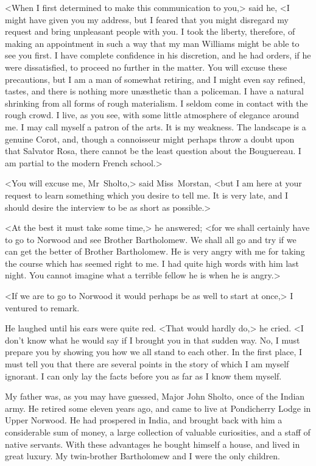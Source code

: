 <When I first determined to make this communication to you,> said he, <I might have given you my address, but I feared that you might disregard my request and bring unpleasant people with you. I took the liberty, therefore, of making an appointment in such a way that my man Williams might be able to see you first. I have complete confidence in his discretion, and he had orders, if he were dissatisfied, to proceed no further in the matter. You will excuse these precautions, but I am a man of somewhat retiring, and I might even say refined, tastes, and there is nothing more unæsthetic than a policeman. I have a natural shrinking from all forms of rough materialism. I seldom come in contact with the rough crowd. I live, as you see, with some little atmosphere of elegance around me. I may call myself a patron of the arts. It is my weakness. The landscape is a genuine Corot, and, though a connoisseur might perhaps throw a doubt upon that Salvator Rosa, there cannot be the least question about the Bouguereau. I am partial to the modern French school.>

<You will excuse me, Mr~Sholto,> said Miss~Morstan, <but I am here at your request to learn something which you desire to tell me. It is very late, and I should desire the interview to be as short as possible.>

<At the best it must take some time,> he answered; <for we shall certainly have to go to Norwood and see Brother Bartholomew. We shall all go and try if we can get the better of Brother Bartholomew. He is very angry with me for taking the course which has seemed right to me. I had quite high words with him last night. You cannot imagine what a terrible fellow he is when he is angry.>

<If we are to go to Norwood it would perhaps be as well to start at once,> I ventured to remark.

He laughed until his ears were quite red. <That would hardly do,> he cried. <I don't know what he would say if I brought you in that sudden way. No, I must prepare you by showing you how we all stand to each other. In the first place, I must tell you that there are several points in the story of which I am myself ignorant. I can only lay the facts before you as far as I know them myself.

My father was, as you may have guessed, Major John Sholto, once of the Indian army. He retired some eleven years ago, and came to live at Pondicherry Lodge in Upper Norwood. He had prospered in India, and brought back with him a considerable sum of money, a large collection of valuable curiosities, and a staff of native servants. With these advantages he bought himself a house, and lived in great luxury. My twin-brother Bartholomew and I were the only children.

